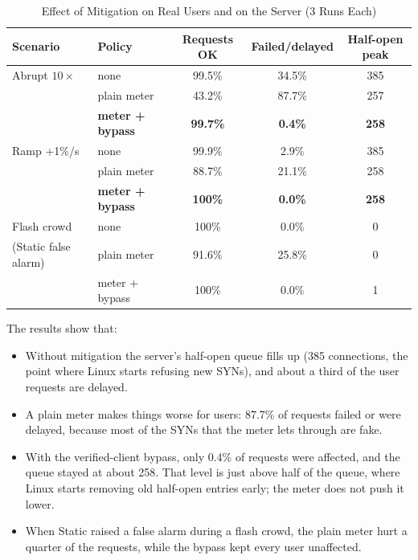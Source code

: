 \documentclass[12pt,a4paper]{article}
\begin{document}
\begin{table}[H]
\centering
\caption{Effect of Mitigation on Real Users and on the Server (3 Runs Each)}
\label{tab:mitigation}
\small
\begin{tabular}{llccc}
\toprule
Scenario & Policy & Requests OK & Failed/delayed & Half-open peak \\
\midrule
Abrupt $10\times$ & none              & 99.5\%  & 34.5\% & 385 \\
                  & plain meter       & 43.2\%  & 87.7\% & 257 \\
                  & \textbf{meter + bypass} & \textbf{99.7\%} & \textbf{0.4\%} & \textbf{258} \\
\midrule
Ramp +1\%/s       & none              & 99.9\%  & 2.9\%  & 385 \\
                  & plain meter       & 88.7\%  & 21.1\% & 258 \\
                  & \textbf{meter + bypass} & \textbf{100\%} & \textbf{0.0\%} & \textbf{258} \\
\midrule
Flash crowd       & none              & 100\%   & 0.0\%  & 0 \\
(Static false alarm) & plain meter    & 91.6\%  & 25.8\% & 0 \\
                  & meter + bypass    & 100\%   & 0.0\%  & 1 \\
\bottomrule
\end{tabular}
\end{table}

The results show that:
\begin{itemize}
  \item Without mitigation the server's half-open queue fills up (385
  connections, the point where Linux starts refusing new SYNs), and about a
  third of the user requests are delayed.
  \item A plain meter makes things worse for users: 87.7\% of requests failed or
  were delayed, because most of the SYNs that the meter lets through are fake.
  \item With the verified-client bypass, only 0.4\% of requests were affected,
  and the queue stayed at about 258. That level is just above half of the
  queue, where Linux starts removing old half-open entries early; the meter
  does not push it lower.
  \item When Static raised a false alarm during a flash crowd, the plain meter
  hurt a quarter of the requests, while the bypass kept every user unaffected.
\end{itemize}
\end{document}
